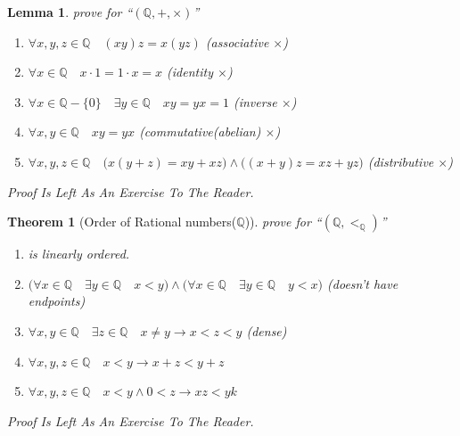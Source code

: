 \documentclass[10pt,a4paper]{book}
\newtheorem{theorem}{Theorem}[section]
\newtheorem{lemma}{Lemma}[section]
\begin{document}
\begin{lemma}prove for  ``$ (\mathbb{Q} , + , \times  )  $''
    \begin{enumerate}
        \setlength{\itemsep}{0pt} %
        \item       $\forall x ,y ,z  \in \mathbb{Q} \quad (x   y )  z  = x  (y   z )  $  (associative $\times$)
        \item       $\forall x \in \mathbb{Q} \quad x \cdot 1 = 1 \cdot x = x$  (identity  $\times$)
        \item       $\forall x  \in \mathbb{Q} - \{0\} \quad \exists y \in \mathbb{Q} \quad x  y = y  x = 1$  (inverse  $\times$)
        \item       $\forall x ,y  \in \mathbb{Q} \quad x   y  = y   x $  (commutative(abelian)  $\times$)
        \item       $\forall x ,y ,z  \in \mathbb{Q} \quad \Big(x   (y  + z ) = x   y  +  x   z  \Big)
                  \land     \Big((x  + y )  z  = x   z  +  y   z  \Big)  $ (distributive $\times$)
    \end{enumerate}
    Proof Is Left As An Exercise To The Reader.
\end{lemma}

\begin{theorem}
    [Order of Rational numbers($\mathbb{Q}$)] prove for  ``$ (\mathbb{Q} , <_\mathbb{Q}  )  $''
    \begin{enumerate}
        \setlength{\itemsep}{0pt} %
        \item        is linearly ordered.
        \item       $ \Big( \forall x \in \mathbb{Q} \quad   \exists y \in \mathbb{Q} \quad  x < y \Big)
                  \land \Big( \forall x \in \mathbb{Q} \quad   \exists y \in \mathbb{Q} \quad   y < x \Big)  $ (doesn't have endpoints)
        \item       $  \forall x,y  \in \mathbb{Q} \quad  \exists z \in \mathbb{Q}  \quad  x \not= y \to  x < z < y  $ (dense)
        \item       $\forall x ,y ,z \in \mathbb{Q} \quad x  < y  \to x  + z < y  + z  $
        \item       $\forall x ,y ,z \in \mathbb{Q} \quad x  < y  \land 0 < z \to x  z < y  k  $
    \end{enumerate}
    Proof Is Left As An Exercise To The Reader.

\end{theorem}
\end{document}
